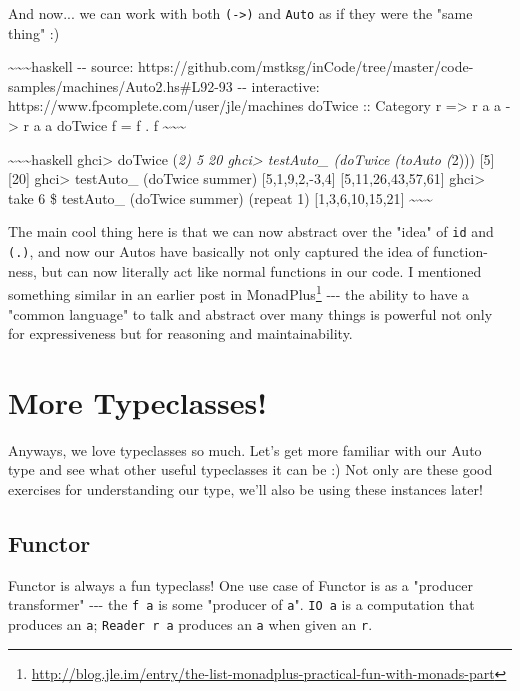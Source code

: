 \documentclass[]{article}
\renewcommand{\href}[2]{#2\footnote{\url{#1}}}
\begin{document}
And now... we can work with both \texttt{(-\textgreater{})} and \texttt{Auto} as
if they were the "same thing" :)

\textasciitilde{}\textasciitilde{}\textasciitilde{}haskell -\/- source:
https://github.com/mstksg/inCode/tree/master/code-samples/machines/Auto2.hs\#L92-93
-\/- interactive: https://www.fpcomplete.com/user/jle/machines doTwice ::
Category r =\textgreater{} r a a -\textgreater{} r a a doTwice f = f . f
\textasciitilde{}\textasciitilde{}\textasciitilde{}

\textasciitilde{}\textasciitilde{}\textasciitilde{}haskell ghci\textgreater{}
doTwice (\emph{2) 5 20 ghci\textgreater{} testAuto\_ (doTwice (toAuto (}2)))
{[}5{]} {[}20{]} ghci\textgreater{} testAuto\_ (doTwice summer)
{[}5,1,9,2,-3,4{]} {[}5,11,26,43,57,61{]} ghci\textgreater{} take 6 \$
testAuto\_ (doTwice summer) (repeat 1) {[}1,3,6,10,15,21{]}
\textasciitilde{}\textasciitilde{}\textasciitilde{}

The main cool thing here is that we can now abstract over the "idea" of
\texttt{id} and \texttt{(.)}, and now our Autos have basically not only captured
the idea of function-ness, but can now literally act like normal functions in
our code. I mentioned something similar in an earlier post
\href{http://blog.jle.im/entry/the-list-monadplus-practical-fun-with-monads-part}{in
MonadPlus} -\/-\/- the ability to have a "common language" to talk and abstract
over many things is powerful not only for expressiveness but for reasoning and
maintainability.

\section{More Typeclasses!}

Anyways, we love typeclasses so much. Let's get more familiar with our Auto type
and see what other useful typeclasses it can be :) Not only are these good
exercises for understanding our type, we'll also be using these instances later!

\subsection{Functor}

Functor is always a fun typeclass! One use case of Functor is as a "producer
transformer" -\/-\/- the \texttt{f\ a} is some "producer of \texttt{a}".
\texttt{IO\ a} is a computation that produces an \texttt{a};
\texttt{Reader\ r\ a} produces an \texttt{a} when given an \texttt{r}.
\end{document}
